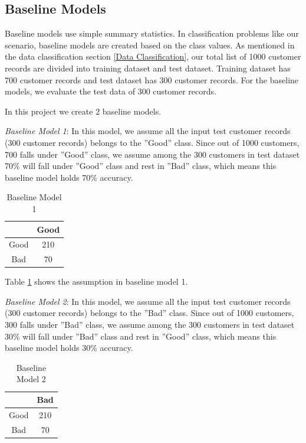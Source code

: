 \documentclass[sigconf]{acmart}
\begin{document}
\subsection{Baseline Models}

Baseline models use simple summary statistics. In classification problems like our scenario, baseline models are created based on the class values. As mentioned in the data classification section \ref{Data Classification}, our total list of 1000 customer records are divided into training dataset and test dataset. Training dataset has 700 customer records and test dataset has 300 customer records. For the baseline models, we evaluate the test data of 300 customer records.

In this project we create 2 baseline models. 

\textit{Baseline Model 1}: In this model, we assume all the input test customer records (300 customer records) belongs to the ''Good'' class. Since out of 1000 customers, 700 falls under ''Good'' class, we assume among the 300 customers in test dataset 70\% will fall under ''Good'' class and rest in ''Bad'' class, which means this baseline model holds 70\% accuracy. 

\begin{table}
  \caption{Baseline Model 1}
  \label{tab:table2}
  \begin{tabular}{cc}
    \toprule
     & Good\\
    \midrule
    Good& 210\\
    Bad& 70\\
    \bottomrule
  \end{tabular}
\end{table}

Table \ref{tab:table2} shows the assumption in baseline model 1.

\textit{Baseline Model 2}: In this model, we assume all the input test customer records (300 customer records) belongs to the ''Bad'' class. Since out of 1000 customers, 300 falls under ''Bad'' class, we assume among the 300 customers in test dataset 30\% will fall under ''Bad'' class and rest in ''Good'' class, which means this baseline model holds 30\% accuracy. 

\begin{table}
  \caption{Baseline Model 2}
  \label{tab:table3}
  \begin{tabular}{cc}
    \toprule
     & Bad\\
    \midrule
    Good& 210\\
    Bad& 70\\
    \bottomrule
  \end{tabular}
\end{table}
\end{document}
